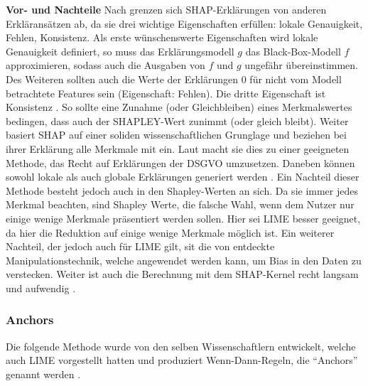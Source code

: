 \textbf{Vor- und Nachteile}
Nach \textcite{lundberg2017unified} grenzen sich SHAP-Erklärungen von anderen Erkläransätzen ab, da sie drei wichtige Eigenschaften erfüllen: lokale Genauigkeit, Fehlen, Konsistenz.
Als erste wünschenswerte Eigenschaften wird lokale Genauigkeit definiert, so muss das Erklärungsmodell $g$ das Black-Box-Modell $f$ approximieren, sodass auch die Ausgaben von $f$ und $g$ ungefähr übereinstimmen. Des Weiteren sollten auch die Werte der Erklärungen 0 für nicht vom Modell betrachtete Features sein (Eigenschaft: Fehlen). Die dritte Eigenschaft ist Konsistenz \cite{lundberg2017unified}. So sollte eine Zunahme (oder Gleichbleiben) eines Merkmalswertes bedingen, dass auch der SHAPLEY-Wert zunimmt (oder gleich bleibt). Weiter basiert SHAP auf einer soliden wissenschaftlichen Grunglage und beziehen bei ihrer Erklärung alle Merkmale mit ein. Laut \textcite{molnar2022} macht sie dies zu einer geeigneten Methode, das Recht auf Erklärungen der DSGVO umzusetzen. Daneben können sowohl lokale als auch globale Erklärungen generiert werden \cite{molnar2022}. Ein Nachteil dieser Methode besteht jedoch auch in den Shapley-Werten an sich. Da sie immer jedes Merkmal beachten, sind Shapley Werte, die falsche Wahl, wenn dem Nutzer nur einige wenige Merkmale präsentiert werden sollen. Hier sei LIME besser geeignet, da hier die Reduktion auf einige wenige Merkmale möglich ist.
Ein weiterer Nachteil, der jedoch auch für LIME gilt, sit die von \textcite{slack2020fooling} entdeckte Manipulationstechnik, welche angewendet werden kann, um Bias in den Daten zu verstecken. Weiter ist auch die Berechnung mit dem SHAP-Kernel recht langsam und aufwendig \cite{molnar2022}.

\subsubsection{Anchors}
Die folgende Methode wurde von den selben Wissenschaftlern entwickelt, welche auch LIME vorgestellt hatten und produziert Wenn-Dann-Regeln, die \enquote{Anchors} genannt werden \cite{ribeiro2018anchors}.


